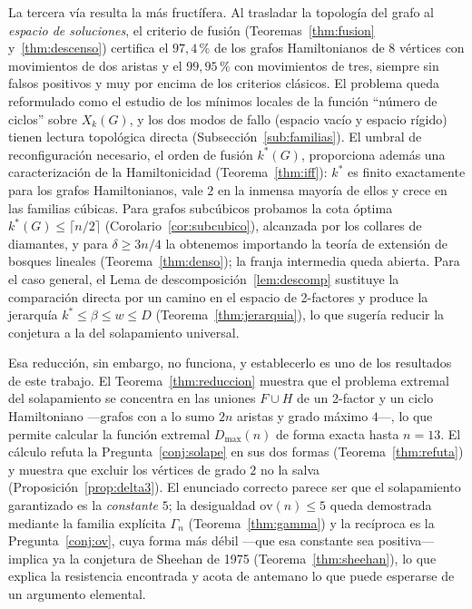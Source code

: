 \documentclass[11pt,a4paper]{article}
\theoremstyle{definition}
\theoremstyle{remark}
\begin{document}
La tercera vía resulta la más fructífera. Al trasladar la topología del grafo al \emph{espacio de soluciones}, el criterio de fusión (Teoremas~\ref{thm:fusion} y~\ref{thm:descenso}) certifica el $97{,}4\,\%$ de los grafos Hamiltonianos de $8$ vértices con movimientos de dos aristas y el $99{,}95\,\%$ con movimientos de tres, siempre sin falsos positivos y muy por encima de los criterios clásicos. El problema queda reformulado como el estudio de los mínimos locales de la función ``número de ciclos'' sobre $X_k(G)$, y los dos modos de fallo (espacio vacío y espacio rígido) tienen lectura topológica directa (Subsección~\ref{sub:familias}). El umbral de reconfiguración necesario, el orden de fusión $k^*(G)$, proporciona además una caracterización de la Hamiltonicidad (Teorema~\ref{thm:iff}): $k^*$ es finito exactamente para los grafos Hamiltonianos, vale $2$ en la inmensa mayoría de ellos y crece en las familias cúbicas. Para grafos subcúbicos probamos la cota óptima $k^*(G)\le\lceil n/2\rceil$ (Corolario~\ref{cor:subcubico}), alcanzada por los collares de diamantes, y para $\delta\ge3n/4$ la obtenemos importando la teoría de extensión de bosques lineales (Teorema~\ref{thm:denso}); la franja intermedia queda abierta. Para el caso general, el Lema de descomposición~\ref{lem:descomp} sustituye la comparación directa por un camino en el espacio de 2-factores y produce la jerarquía $k^*\le\beta\le w\le D$ (Teorema~\ref{thm:jerarquia}), lo que sugería reducir la conjetura a la del solapamiento universal.

Esa reducción, sin embargo, no funciona, y establecerlo es uno de los resultados de este trabajo. El Teorema~\ref{thm:reduccion} muestra que el problema extremal del solapamiento se concentra en las uniones $F\cup H$ de un 2-factor y un ciclo Hamiltoniano —grafos con a lo sumo $2n$ aristas y grado máximo $4$—, lo que permite calcular la función extremal $D_{\max}(n)$ de forma exacta hasta $n=13$. El cálculo refuta la Pregunta~\ref{conj:solape} en sus dos formas (Teorema~\ref{thm:refuta}) y muestra que excluir los vértices de grado $2$ no la salva (Proposición~\ref{prop:delta3}). El enunciado correcto parece ser que el solapamiento garantizado es la \emph{constante} $5$; la desigualdad $\mathrm{ov}(n)\le5$ queda demostrada mediante la familia explícita $\Gamma_n$ (Teorema~\ref{thm:gamma}) y la recíproca es la Pregunta~\ref{conj:ov}, cuya forma más débil —que esa constante sea positiva— implica ya la conjetura de Sheehan de 1975 (Teorema~\ref{thm:sheehan}), lo que explica la resistencia encontrada y acota de antemano lo que puede esperarse de un argumento elemental.
\end{document}
